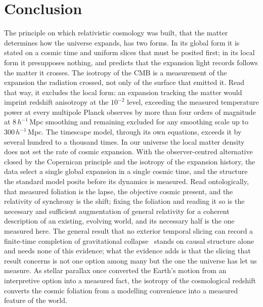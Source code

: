 \documentclass[11pt,a4paper]{article}
\begin{document}
\section{Conclusion}\label{sec:conclusion}

The principle on which relativistic cosmology was built, that the matter determines how the universe expands, has two forms. In its global form it is stated on a cosmic time and uniform slices that must be posited first; in its local form it presupposes nothing, and predicts that the expansion light records follows the matter it crosses. The isotropy of the CMB is a measurement of the expansion the radiation crossed, not only of the surface that emitted it. Read that way, it excludes the local form: an expansion tracking the matter would imprint redshift anisotropy at the $10^{-2}$ level, exceeding the measured temperature power at every multipole Planck observes by more than four orders of magnitude at $8\,h^{-1}$\,Mpc smoothing and remaining excluded for any smoothing scale up to $300\,h^{-1}$\,Mpc. The timescape model, through its own equations, exceeds it by several hundred to a thousand times. In our universe the local matter density does not set the rate of cosmic expansion. With the observer-centred alternative closed by the Copernican principle and the isotropy of the expansion history, the data select a single global expansion in a single cosmic time, and the structure the standard model posits before its dynamics is measured. Read ontologically, that measured foliation is the lapse, the objective cosmic present, and the relativity of synchrony is the shift; fixing the foliation and reading it so is the necessary and sufficient augmentation of general relativity for a coherent description of an existing, evolving world, and its necessary half is the one measured here. The general result that no exterior temporal slicing can record a finite-time completion of gravitational collapse~\cite{JanzenBHcausality} stands on causal structure alone and needs none of this evidence; what the evidence adds is that the slicing that result concerns is not one option among many but the one the universe has let us measure. As stellar parallax once converted the Earth's motion from an interpretive option into a measured fact, the isotropy of the cosmological redshift converts the cosmic foliation from a modelling convenience into a measured feature of the world.
\end{document}
